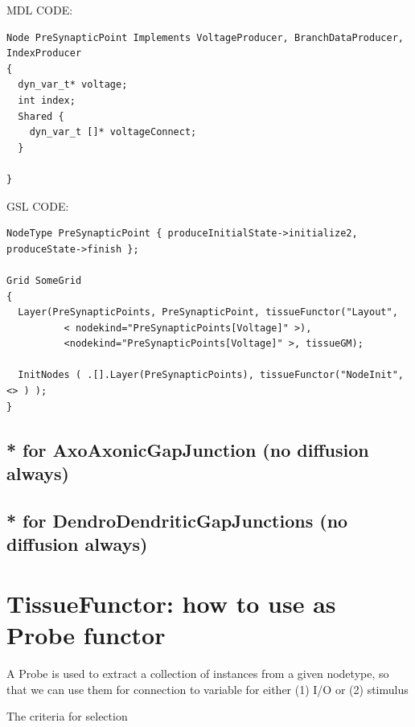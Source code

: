 MDL CODE:
\begin{verbatim}
Node PreSynapticPoint Implements VoltageProducer, BranchDataProducer, IndexProducer
{
  dyn_var_t* voltage;
  int index;
  Shared {
    dyn_var_t []* voltageConnect;
  }

}
\end{verbatim}


GSL CODE:
{\small
\begin{verbatim}
NodeType PreSynapticPoint { produceInitialState->initialize2, produceState->finish };

Grid SomeGrid
{
  Layer(PreSynapticPoints, PreSynapticPoint, tissueFunctor("Layout", 
          < nodekind="PreSynapticPoints[Voltage]" >), 
          <nodekind="PreSynapticPoints[Voltage]" >, tissueGM);
 
  InitNodes ( .[].Layer(PreSynapticPoints), tissueFunctor("NodeInit", <> ) );
}
\end{verbatim}
}

\subsection{* for AxoAxonicGapJunction (no diffusion always)}

\subsection{* for DendroDendriticGapJunctions (no diffusion always)}

\section{TissueFunctor: how to use as Probe functor}
\label{sec:TissueFunctor-as-probe-functor}

A Probe is used to extract a collection of instances from a given
nodetype, so that we can use them for connection to variable for either
(1) I/O or (2) stimulus

The criteria for selection

